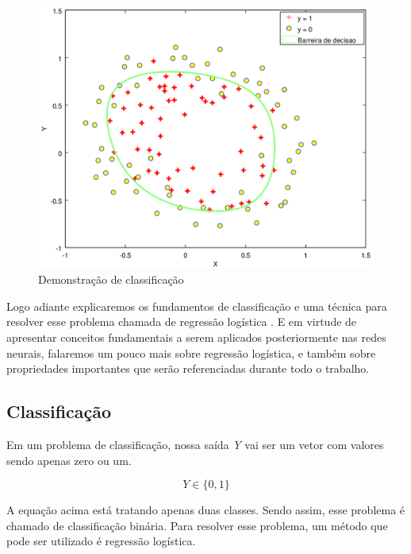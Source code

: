 \begin{figure}[htb]
  \caption{Demonstração de classificação}\label{fig:demclassificacao}
  \begin{center}
      \includegraphics[scale=0.75]{img/classificacao2}
  \end{center}
\end{figure}


Logo adiante explicaremos os fundamentos de classificação e uma técnica para resolver esse problema chamada de regressão logística \cite{hosmer2004applied}. E em virtude de apresentar conceitos fundamentais a serem aplicados posteriormente nas redes neurais, falaremos um pouco mais sobre regressão logística, e também sobre propriedades importantes que serão referenciadas durante todo o trabalho.

\subsection{Classificação}

Em um problema de classificação, nossa saída \textit{Y} vai ser um vetor com valores sendo apenas zero ou um.

\begin{equation}
Y \in \{0, 1\} \nonumber
\end{equation}

A equação acima está tratando apenas duas classes. Sendo assim, esse problema é chamado de classificação binária. Para resolver esse problema, um método que pode ser utilizado é regressão logística.

